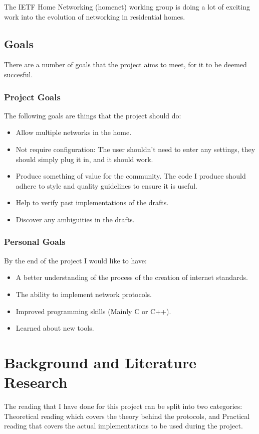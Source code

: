 \documentclass[12pt]{report}
\begin{document}
The IETF Home Networking (homenet) working group is doing a lot of exciting work
into the evolution of networking in residential homes. 

\section{Goals}

There are a number of goals that the project aims to meet, for it to be deemed
succesful.

\subsection{Project Goals }
The following goals are things that the project should do:

\begin{itemize}
	\item Allow multiple networks in the home. 
	\item Not require configuration: The user shouldn't need to enter any 
	settings, they should simply plug it in, and it should  work.
	\item Produce something of value for the community. The code I produce  
	should adhere to style and quality guidelines to ensure it is useful.
	\item Help to verify past implementations of the drafts.
	\item Discover any ambiguities in the drafts.
\end{itemize}

\subsection{Personal Goals}
By the end of the project I would like to have:

\begin{itemize}
	\item A better understanding of the process of the creation of internet
	standards.
	\item The ability to implement network protocols. 
	\item Improved programming skills (Mainly C or C++).
	\item Learned about new tools.
\end{itemize}

\chapter{Background and Literature Research}
The reading that I have done for this project can be split into two categories:
Theoretical reading which covers the theory behind the protocols, and Practical 
reading that covers the actual implementations to be used during the project.
\end{document}
